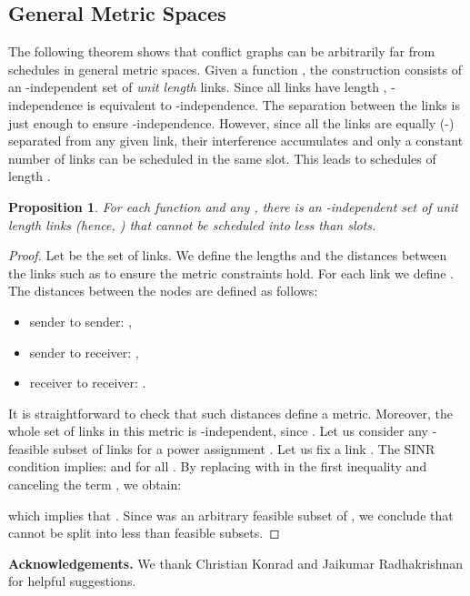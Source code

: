 \documentclass[11pt]{article}
\newcommand{\mypara}[1]{\smallskip\noindent\textbf{#1.}}  \newcommand{\tightpara}[1]{\noindent\textbf{#1.}}
\newcommand{\subsec}[1]{\subsection{#1}}
\newtheorem{proposition}{Proposition}
\begin{document}
\subsec{General Metric Spaces}
The following theorem shows that conflict graphs can be arbitrarily far from schedules in general metric spaces. Given a function , the construction consists of an -independent set of \emph{unit length} links. Since all links have length , -independence is equivalent to -independence. The separation between the links is just enough to ensure -independence. However, since all the links are equally (-) separated from any given link, their interference accumulates and only a constant number of links can be scheduled in the same slot. This leads to schedules of length . 
\begin{proposition}
For each function  and any , there is an -independent set of  unit length links (hence, ) that cannot be scheduled into less than  slots.
\end{proposition}

\begin{proof}
Let  be the set of links. We define the lengths and the distances between the links such as to ensure the metric constraints hold. For each link  we define . The distances between the nodes are defined as follows:
\begin{itemize} 
\setlength{\itemsep}{0cm}\setlength{\parskip}{0cm}\item[\checkmark]{sender to sender: ,}
 \item[\checkmark]{sender to receiver: ,}
 \item[\checkmark]{ receiver to receiver: .}
\end{itemize}
It is straightforward to check that such distances define a metric. Moreover, the whole set of links in this metric is -independent, since . Let us consider any -feasible subset  of  links for a power assignment . Let us fix a link . The SINR condition implies:  and  for all .  By replacing  with  in the first inequality and canceling the term , we obtain:

which implies that . Since  was an arbitrary feasible subset of , we conclude that  cannot be split into less than  feasible subsets.
\end{proof}


\mypara{Acknowledgements} We thank Christian Konrad and Jaikumar Radhakrishnan for helpful suggestions.



\end{document}
